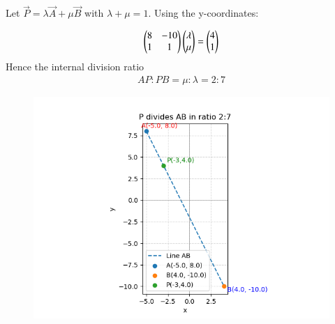 \documentclass[journal]{IEEEtran}
\begin{document}
Let $\vec{P} = \lambda\vec{A} + \mu\vec{B}$ with $\lambda + \mu =1$. Using the y-coordinates:

\begin{align}
    \begin{pmatrix}8 & -10 \\ 1 & 1\end{pmatrix} \begin{pmatrix}\lambda \\ \mu\end{pmatrix} = \begin{pmatrix}4 \\ 1\end{pmatrix}
\end{align}
Hence the internal division ratio
\begin{align}
    AP:PB = \mu:\lambda=2:7
\end{align}

\begin{figure}
    \centering
    \includegraphics[width=0.9\columnwidth]{figs/Figure.png}
\end{figure}
\end{document}
